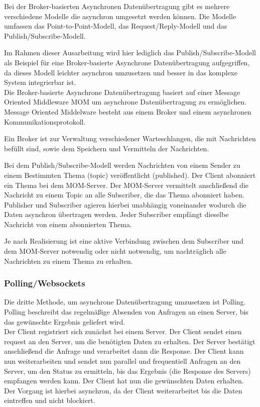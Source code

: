 Bei der Broker-basierten Asynchronen Datenübertragung gibt es mehrere verschiedene Modelle die asynchron umgesetzt werden können. Die Modelle umfassen das Point-to-Point-Modell, das Request/Reply-Modell und das Publish/Subscribe-Modell. \cite*{abts:2019,tremp:2021}

Im Rahmen dieser Ausarbeitung wird hier lediglich das Publish/Subscribe-Modell als Beispiel für eine Broker-basierte Asynchrone Datenübertragung aufgegriffen, da dieses Modell leichter asynchron umzusetzen und besser in das komplexe System integrierbar ist. \\

Die Broker-basierte Asynchrone Datenübertragung basiert auf einer Message Oriented Middleware \ac{MOM} um asynchrone Datenübertragung zu ermöglichen. Message Oriented Middelware besteht aus einem Broker und einem asynchronen Kommunikationsprotokoll. \cite*{tremp:2021}

Ein Broker ist zur Verwaltung verschiedener Warteschlangen, die mit Nachrichten befüllt sind, sowie dem Speichern und Vermitteln der Nachrichten. \cite*{tremp:2021}

Bei dem Publish/Subscribe-Modell werden Nachrichten von einem Sender zu einem Bestimmten Thema (topic) veröffentlicht (published). Der Client abonniert ein Thema bei dem MOM-Server. Der MOM-Server vermittelt anschließend die Nachricht zu einem Topic an alle Subscriber, die das Thema abonniert haben. \cite*{abts:2019} Publisher und Subscriber agieren hierbei unabhängig voneinander wodurch die Daten asynchron übertragen werden. Jeder Subscriber empfängt dieselbe Nachricht von einem abonnierten Thema. \cite*{tremp:2021}

Je nach Realisierung ist eine aktive Verbindung zwischen dem Subscriber und dem MOM-Server notwendig oder nicht notwendig, um nachträglich alle Nachrichten zu einem Thema zu erhalten. \cite*{abts:2019}

\subsubsection{Polling/Websockets}
Die dritte Methode, um asynchrone Datenübertragung umzusetzen ist Polling. Polling beschreibt das regelmäßige Absenden von Anfragen an einen Server, bis das gewünschte Ergebnis geliefert wird. \cite*{goll:2020} \\

Der Client registriert sich zunächst bei einem Server. Der Client sendet einen request an den Server, um die benötigten Daten zu erhalten. Der Server bestätigt anschließend die Anfrage und verarbeitet dann die Response. \cite*{goll:2020} Der Client kann nun weiterarbeiten und sendet nun parallel und frequentiell Anfragen an den Server, um den Status zu ermitteln, bis das Ergebnis (die Response des Servers) empfangen werden kann. Der Client hat nun die gewünschten Daten erhalten. Der Vorgang ist hierbei asynchron, da der Client weiterarbeitet bis die Daten eintreffen und nicht blockiert. \\

